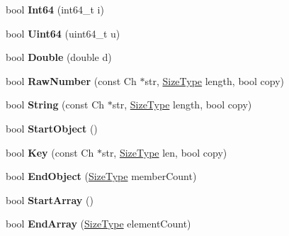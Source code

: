 \begin{DoxyCompactItemize}
\item 
bool {\bfseries Int64} (int64\+\_\+t i)\hypertarget{a00126_ac5a9e416e18129a7b787f251019a828f}{}\label{a00126_ac5a9e416e18129a7b787f251019a828f}

\item 
bool {\bfseries Uint64} (uint64\+\_\+t u)\hypertarget{a00126_abfc56c58cf0b65318e376fc5f2879292}{}\label{a00126_abfc56c58cf0b65318e376fc5f2879292}

\item 
bool {\bfseries Double} (double d)\hypertarget{a00126_aed0532dbda3ac6f3ca7196af06066b86}{}\label{a00126_aed0532dbda3ac6f3ca7196af06066b86}

\item 
bool {\bfseries Raw\+Number} (const Ch $\ast$str, \hyperlink{a00677_a5ed6e6e67250fadbd041127e6386dcb5}{Size\+Type} length, bool copy)\hypertarget{a00126_ae4f024145421d2c1dde08a9de528722a}{}\label{a00126_ae4f024145421d2c1dde08a9de528722a}

\item 
bool {\bfseries String} (const Ch $\ast$str, \hyperlink{a00677_a5ed6e6e67250fadbd041127e6386dcb5}{Size\+Type} length, bool copy)\hypertarget{a00126_a33cf3f83307a8fea38c3238ef75c3d58}{}\label{a00126_a33cf3f83307a8fea38c3238ef75c3d58}

\item 
bool {\bfseries Start\+Object} ()\hypertarget{a00126_a59972d612c3d37aae9a30222e428d216}{}\label{a00126_a59972d612c3d37aae9a30222e428d216}

\item 
bool {\bfseries Key} (const Ch $\ast$str, \hyperlink{a00677_a5ed6e6e67250fadbd041127e6386dcb5}{Size\+Type} len, bool copy)\hypertarget{a00126_a6d08b458216ec4a09eed9d94800d05c1}{}\label{a00126_a6d08b458216ec4a09eed9d94800d05c1}

\item 
bool {\bfseries End\+Object} (\hyperlink{a00677_a5ed6e6e67250fadbd041127e6386dcb5}{Size\+Type} member\+Count)\hypertarget{a00126_aa89e14f0f731f6acdec22a0f7e003037}{}\label{a00126_aa89e14f0f731f6acdec22a0f7e003037}

\item 
bool {\bfseries Start\+Array} ()\hypertarget{a00126_aba13751f802531ed8cbd850778ea993c}{}\label{a00126_aba13751f802531ed8cbd850778ea993c}

\item 
bool {\bfseries End\+Array} (\hyperlink{a00677_a5ed6e6e67250fadbd041127e6386dcb5}{Size\+Type} element\+Count)\hypertarget{a00126_a67b501f0f65d40e0086ca8216882b34f}{}\label{a00126_a67b501f0f65d40e0086ca8216882b34f}


\end{DoxyCompactItemize}
